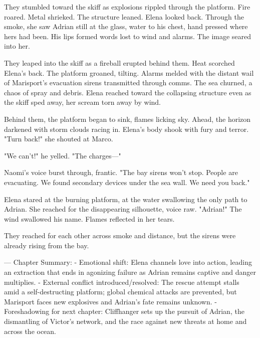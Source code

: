 They stumbled toward the skiff as explosions rippled through the platform. Fire roared. Metal shrieked. The structure leaned. Elena looked back. Through the smoke, she saw Adrian still at the glass, water to his chest, hand pressed where hers had been. His lips formed words lost to wind and alarms. The image seared into her.

They leaped into the skiff as a fireball erupted behind them. Heat scorched Elena's back. The platform groaned, tilting. Alarms melded with the distant wail of Marisport's evacuation sirens transmitted through comms. The sea churned, a chaos of spray and debris. Elena reached toward the collapsing structure even as the skiff sped away, her scream torn away by wind.

Behind them, the platform began to sink, flames licking sky. Ahead, the horizon darkened with storm clouds racing in. Elena's body shook with fury and terror. "Turn back!" she shouted at Marco.

"We can't!" he yelled. "The charges—"

Naomi's voice burst through, frantic. "The bay sirens won't stop. People are evacuating. We found secondary devices under the sea wall. We need you back."

Elena stared at the burning platform, at the water swallowing the only path to Adrian. She reached for the disappearing silhouette, voice raw. "Adrian!" The wind swallowed his name. Flames reflected in her tears.

They reached for each other across smoke and distance, but the sirens were already rising from the bay.

\bigskip

---
Chapter Summary:
- Emotional shift: Elena channels love into action, leading an extraction that ends in agonizing failure as Adrian remains captive and danger multiplies.
- External conflict introduced/resolved: The rescue attempt stalls amid a self-destructing platform; global chemical attacks are prevented, but Marisport faces new explosives and Adrian's fate remains unknown.
- Foreshadowing for next chapter: Cliffhanger sets up the pursuit of Adrian, the dismantling of Victor's network, and the race against new threats at home and across the ocean.
